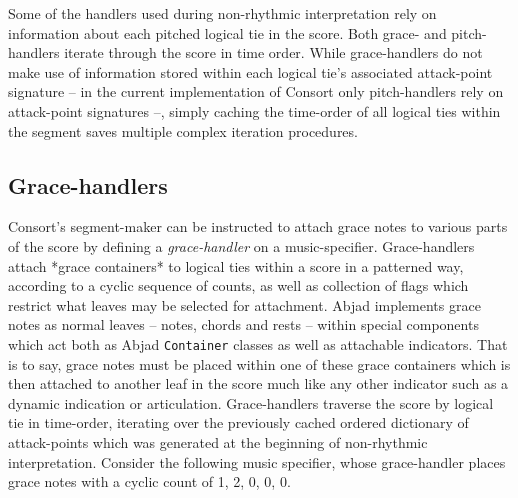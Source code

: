 Some of the handlers used during non-rhythmic interpretation rely on
information about each pitched logical tie in the score. Both grace- and
pitch-handlers iterate through the score in time order. While grace-handlers do
not make use of information stored within each logical tie's associated
attack-point signature -- in the current implementation of Consort only
pitch-handlers rely on attack-point signatures --, simply caching the
time-order of all logical ties within the segment saves multiple complex
iteration procedures.

\subsection{Grace-handlers}
\label{ssec:grace-handlers}

Consort's segment-maker can be instructed to attach grace notes to various
parts of the score by defining a \emph{grace-handler} on a music-specifier.
Grace-handlers attach *grace containers* to logical ties within a score in a
patterned way, according to a cyclic sequence of counts, as well as collection
of flags which restrict what leaves may be selected for attachment.
Abjad implements grace notes as normal leaves -- notes, chords and rests --
within special components which act both as Abjad \texttt{Container} classes as
well as attachable indicators. That is to say, grace notes must be placed
within one of these grace containers which is then attached to another leaf in
the score much like any other indicator such as a dynamic indication or
articulation. Grace-handlers traverse the score by logical tie in time-order,
iterating over the previously cached ordered dictionary of attack-points which
was generated at the beginning of non-rhythmic interpretation. Consider the
following music specifier, whose grace-handler places grace notes with a cyclic
count of 1, 2, 0, 0, 0.

\begin{comment}
<abjad>[stylesheet=../consort.ily]
music_specifier = consort.MusicSpecifier(
    grace_handler=consort.GraceHandler(
        counts=(1, 2, 0, 0, 0),
        ),
    rhythm_maker=rhythmmakertools.TaleaRhythmMaker(
        extra_counts_per_division=(0, 1),
        talea=rhythmmakertools.Talea([1, 2, 3, 1, 4], 16),
        ),
    )
timespan_maker = consort.TaleaTimespanMaker(
    initial_silence_talea=rhythmmakertools.Talea([0, 1], 4),
    playing_groupings=(1, 2, 2),
    playing_talea=rhythmmakertools.Talea([2, 3], 8),
    silence_talea=rhythmmakertools.Talea([1, 2, 3, 4], 8),
    )
music_setting = consort.MusicSetting(
    timespan_maker=timespan_maker,
    v1=music_specifier,
    v2=music_specifier,
    )
segment_maker = consort.SegmentMaker(
    desired_duration_in_seconds=8,
    discard_final_silence=True,
    permitted_time_signatures=[(2, 4), (5, 16), (3, 4)],
    score_template=templatetools.GroupedRhythmicStavesScoreTemplate(
        staff_count=2,
        with_clefs=True,
        ),
    settings=[music_setting],
    tempo=indicatortools.Tempo((1, 4), 72),
    )
show(segment_maker, verbose=False)
</abjad>
\end{comment}

